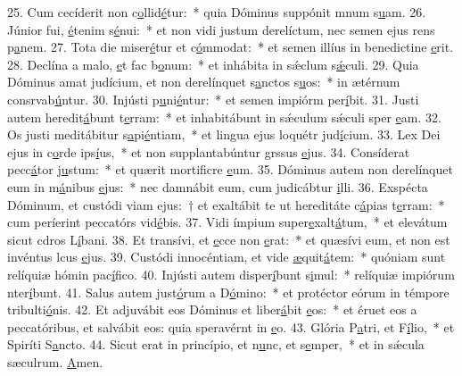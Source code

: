 25. Cum cecíderit non c\uline{o}llid\uline{é}tur:~* quia Dóminus suppónit mnum s\uline{u}am.
26. Júnior fui, \uline{é}tenim s\uline{é}nui:~* et non vidi justum derelíctum, nec semen ejus rens p\uline{a}nem.
27. Tota die miser\uline{é}tur et c\uline{ó}mmodat:~* et semen illíus in benedictine \uline{e}rit.
28. Declína a malo, \uline{e}t fac b\uline{o}num:~* et inhábita in sǽclum s\uline{ǽ}culi.
29. Quia Dóminus amat judícium, et non derelínquet s\uline{a}nctos s\uline{u}os:~* in ætérnum consrvab\uline{ú}ntur.
30. Injústi p\uline{u}ni\uline{é}ntur:~* et semen impiórm per\uline{í}bit.
31. Justi autem heredit\uline{á}bunt t\uline{e}rram:~* et inhabitábunt in sǽculum sǽculi sper \uline{e}am.
32. Os justi meditábitur s\uline{a}pi\uline{é}ntiam,~* et lingua ejus loquétr jud\uline{í}cium.
33. Lex Dei ejus in c\uline{o}rde ips\uline{í}us,~* et non supplantabúntur grssus \uline{e}jus.
34. Consíderat pecc\uline{á}tor j\uline{u}stum:~* et quærit mortificre \uline{e}um.
35. Dóminus autem non derelínquet eum in m\uline{á}nibus \uline{e}jus:~* nec damnábit eum, cum judicábtur \uline{i}lli.
36. Exspécta Dóminum, et custódi viam ejus:~† et exaltábit te ut hereditáte c\uline{á}pias t\uline{e}rram:~* cum períerint peccatórs vid\uline{é}bis.
37. Vidi ímpium super\uline{e}xalt\uline{á}tum,~* et elevátum sicut cdros L\uline{í}bani.
38. Et transívi, et \uline{e}cce non \uline{e}rat:~* et quæsívi eum, et non est invéntus lcus \uline{e}jus.
39. Custódi innocéntiam, et vide \uline{æ}quit\uline{á}tem:~* quóniam sunt relíquiæ hómin pac\uline{í}fico.
40. Injústi autem disper\uline{í}bunt s\uline{i}mul:~* relíquiæ impiórum nter\uline{í}bunt.
41. Salus autem just\uline{ó}rum a D\uline{ó}mino:~* et protéctor eórum in témpore tribulti\uline{ó}nis.
42. Et adjuvábit eos Dóminus et liber\uline{á}bit \uline{e}os:~* et éruet eos a peccatóribus, et salvábit eos: quia speravérnt in \uline{e}o.
43. Glória P\uline{a}tri, et F\uline{í}lio,~* et Spiríti S\uline{a}ncto.
44. Sicut erat in princípio, et n\uline{u}nc, et s\uline{e}mper,~* et in sǽcula sæculrum. \uline{A}men.
